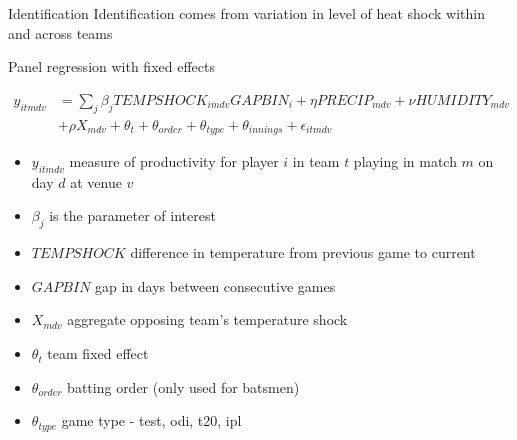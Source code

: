 \documentclass[
  10pt,
  ignorenonframetext,
  twocolumn]{beamer}
\providecommand{\tightlist}{%
  \setlength{\itemsep}{0pt}\setlength{\parskip}{0pt}}
\begin{document}
\begin{frame}{Identification}
\protect\hypertarget{identification}{}
Identification comes from variation in level of heat shock within and
across teams

Panel regression with fixed effects

$$
\begin{aligned}
y_{itmdv} &= \sum_{j} \beta_{j} TEMPSHOCK_{imdv} GAPBIN_{i} + \eta PRECIP_{mdv} + \nu HUMIDITY_{mdv}\\
& + \rho X_{mdv} + \theta_{t} + \theta_{order} + \theta_{type} + \theta_{innings} + \epsilon_{itmdv}
\end{aligned}
$$

\begin{itemize}
\tightlist
\item
  \(y_{itmdv}\) measure of productivity for player \(i\) in team \(t\)
  playing in match \(m\) on day \(d\) at venue \(v\)
\item
  \(\beta_{j}\) is the parameter of interest
\item
  \(TEMPSHOCK\) difference in temperature from previous game to current
\item
  \(GAPBIN\) gap in days between consecutive games
\item
  \(X_{mdv}\) aggregate opposing team's temperature shock
\item
  \(\theta_{t}\) team fixed effect
\item
  \(\theta_{order}\) batting order (only used for batsmen)
\item
  \(\theta_{type}\) game type - test, odi, t20, ipl
\end{itemize}
\end{frame}
\end{document}
